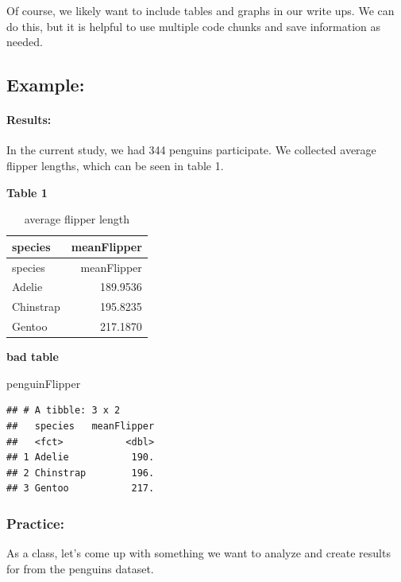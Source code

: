 \documentclass[
]{article}
\newenvironment{Shaded}{\begin{snugshade}}{\end{snugshade}}
\newcommand{\NormalTok}[1]{#1}
\begin{document}
Of course, we likely want to include tables and graphs in our write ups.
We can do this, but it is helpful to use multiple code chunks and save
information as needed.

\subsection{Example:}\label{example}

\paragraph{Results:}\label{results}

In the current study, we had 344 penguins participate. We collected
average flipper lengths, which can be seen in table 1.

\textbf{Table 1}

\begin{longtable}[]{@{}lr@{}}
\caption{average flipper length}\tabularnewline
\toprule\noalign{}
species & meanFlipper \\
\midrule\noalign{}
\endfirsthead
\toprule\noalign{}
species & meanFlipper \\
\midrule\noalign{}
\endhead
\bottomrule\noalign{}
\endlastfoot
Adelie & 189.9536 \\
Chinstrap & 195.8235 \\
Gentoo & 217.1870 \\
\end{longtable}

\textbf{bad table}

\begin{Shaded}
\begin{Highlighting}[]
\NormalTok{penguinFlipper}
\end{Highlighting}
\end{Shaded}

\begin{verbatim}
## # A tibble: 3 x 2
##   species   meanFlipper
##   <fct>           <dbl>
## 1 Adelie           190.
## 2 Chinstrap        196.
## 3 Gentoo           217.
\end{verbatim}

\subsubsection{Practice:}\label{practice-2}

As a class, let's come up with something we want to analyze and create
results for from the penguins dataset.
\end{document}

